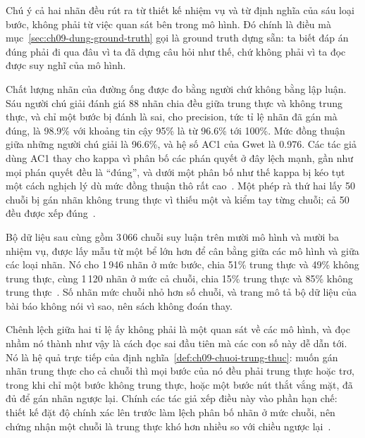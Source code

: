 Chú ý cả hai nhãn đều rút ra từ thiết kế nhiệm vụ và từ định nghĩa của sáu
loại bước, không phải từ việc quan sát bên trong mô hình. Đó chính là điều mà
mục~\ref{sec:ch09-dung-ground-truth} gọi là ground truth dựng sẵn:
ta biết đáp án đúng phải đi qua đâu vì ta đã dựng câu hỏi như thế, chứ không
phải vì ta đọc được suy nghĩ của mô hình.

Chất lượng nhãn của đường ống được đo bằng người chứ không bằng lập luận. Sáu
người chú giải đánh giá 88 nhãn chia đều giữa trung thực và không trung thực,
và chỉ một bước bị đánh là sai, cho precision, tức tỉ lệ nhãn đã gán mà đúng,
là 98.9\% với khoảng tin cậy 95\% là từ 96.6\% tới 100\%. Mức đồng thuận giữa
những người chú giải là 96.6\%, và hệ số AC1 của Gwet là 0.976. Các tác giả
dùng AC1 thay cho kappa vì phân bố các phán quyết ở đây lệch mạnh, gần như mọi
phán quyết đều là \enquote{đúng}, và dưới một phân bố như thế kappa bị kéo tụt
một cách nghịch lý dù mức đồng thuận thô rất cao~\autocite{p21metrics}. Một phép rà thứ hai lấy 50
chuỗi bị gán nhãn không trung thực vì thiếu một
 và kiểm tay từng
chuỗi; cả 50 đều được xếp đúng~\autocite{p21metrics}.

Bộ dữ liệu sau cùng gồm 3\,066 chuỗi suy luận trên mười mô hình và mười ba
nhiệm vụ, được lấy mẫu từ một bể lớn hơn để cân bằng giữa các mô hình và giữa
các loại nhãn. Nó cho 1\,946 nhãn ở mức bước, chia 51\% trung thực và 49\%
không trung thực, cùng 1\,120 nhãn ở mức cả chuỗi, chia 15\% trung thực và
85\% không trung thực~\autocite{p21metrics}. Số nhãn mức chuỗi nhỏ hơn số
chuỗi, và trang mô tả bộ dữ liệu của bài báo không nói vì sao, nên sách không
đoán thay.

Chênh lệch giữa hai tỉ lệ ấy không phải là một quan sát về các mô hình, và đọc
nhầm nó thành như vậy là cách đọc sai đầu tiên mà các con số này dễ dẫn tới.
Nó là hệ quả trực tiếp
của định nghĩa~\ref{def:ch09-chuoi-trung-thuc}: muốn gán nhãn trung thực cho
cả chuỗi thì mọi bước của nó đều phải trung thực hoặc trơ, trong khi chỉ một
bước không trung thực, hoặc một bước nút thắt vắng mặt, đã đủ để gán nhãn
ngược lại. Chính các tác giả xếp điều này vào phần hạn chế: thiết kế đặt độ
chính xác lên trước làm lệch phân bố nhãn ở mức chuỗi, nên chứng nhận một
chuỗi là trung thực khó hơn nhiều so với chiều ngược
lại~\autocite{p21metrics}.
